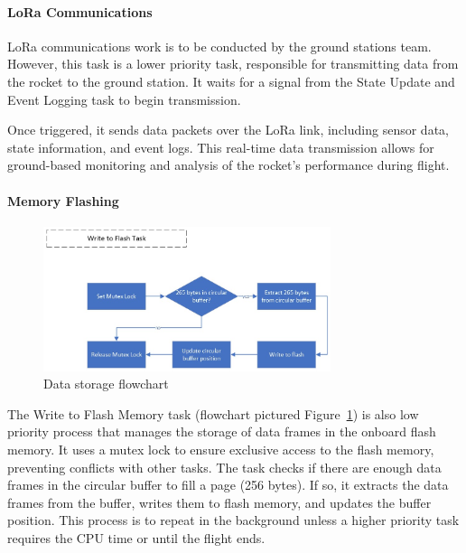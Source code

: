 \paragraph{LoRa Communications}
LoRa communications work is to be conducted by the ground stations team. However, this task is a lower priority task, responsible for transmitting data from the rocket to the ground station. It waits for a signal from the State Update and Event Logging task to begin transmission. 

Once triggered, it sends data packets over the LoRa link, including sensor data, state information, and event logs. This real-time data transmission allows for ground-based monitoring and analysis of the rocket's performance during flight. 

\paragraph{Memory Flashing}
\begin{figure}[ht!]
  \begin{center}
    \hspace{-1.5cm}\includegraphics[width=0.75\textwidth]{./img/Section_4_2_2_5.jpeg}
  \end{center}
  \caption{Data storage flowchart}\label{fig:flowchart-flash}
\end{figure}

The Write to Flash Memory task (flowchart pictured Figure~\ref{fig:flowchart-flash}) is also low priority process that manages the storage of data frames in the onboard flash memory. It uses a mutex lock to ensure exclusive access to the flash memory, preventing conflicts with other tasks. The task checks if there are enough data frames in the circular buffer to fill a page (256 bytes). If so, it extracts the data frames from the buffer, writes them to flash memory, and updates the buffer position. This process is to repeat in the background unless a higher priority task requires the CPU time or until the flight ends.  

